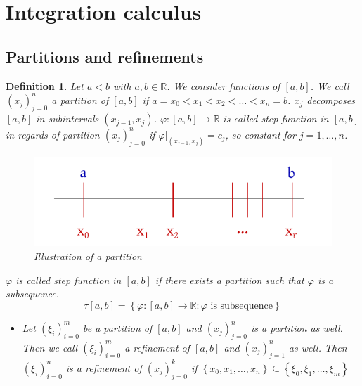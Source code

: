 \documentclass{article}
\newtheorem{definition}{Definition}  \numberwithin{definition}{section}
\newcommand{\set}[1]{\left\{#1\right\}}
\begin{document}
\section{Integration calculus}
\subsection{Partitions and refinements}

\begin{definition}
  Let $a < b$ with $a, b \in \mathbb R$. We consider functions of $[a,b]$.
  We call $(x_j)_{j = 0}^n$ a \emph{partition of $[a,b]$} if $a = x_0 < x_1 < x_2 < \dots < x_n = b$.
  $x_j$ decomposes $[a,b]$ in subintervals $(x_{j-1}, x_j)$.
  $\varphi: [a,b] \to \mathbb R$ is called \emph{step function} in $[a,b]$ in regards of partition $(x_j)_{j=0}^n$
  if $\varphi|_{(x_{j-1}, x_j)} = c_j$, so constant for $j=1,\dots,n$.

  \begin{figure}
    \begin{center}
      \includegraphics{img/09_subintervals.pdf}
      \caption{Illustration of a partition}
      \label{img:subintervals}
    \end{center}
  \end{figure}

  $\varphi$ is called \emph{step function} in $[a,b]$ if there exists a partition such that $\varphi$ is a subsequence.
  \[ \tau[a,b] = \set{\varphi: [a,b] \to \mathbb R: \varphi \text{ is subsequence}} \]
  \begin{itemize}
    \item Let $(\xi_i)_{i=0}^m$ be a partition of $[a,b]$ and $(x_j)_{j=0}^n$ is a partition as well.
      Then we call $(\xi_i)_{i=0}^m$ a \emph{refinement} of $[a,b]$ and $(x_j)_{j=1}^n$ as well.
      Then $(\xi_i)_{i=0}^n$ is a refinement of $(x_j)_{j=0}^k$ if
      $\set{x_0, x_1, \dots, x_n} \subseteq \set{\xi_0, \xi_1, \dots, \xi_m}$


\end{itemize}
\end{definition}
\end{document}

